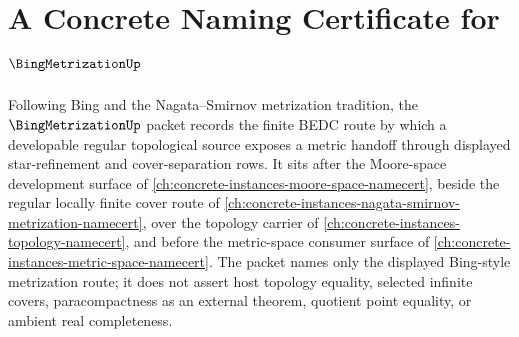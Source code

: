 \chapter{A Concrete Naming Certificate for $\BingMetrizationUp$}
\label{ch:concrete-instances-bing-metrization-namecert}

Following Bing and the Nagata--Smirnov metrization tradition, the $\BingMetrizationUp$ packet records the finite BEDC route by which a developable regular topological source exposes a metric handoff through displayed star-refinement and cover-separation rows. It sits after the Moore-space development surface of \autoref{ch:concrete-instances-moore-space-namecert}, beside the regular locally finite cover route of \autoref{ch:concrete-instances-nagata-smirnov-metrization-namecert}, over the topology carrier of \autoref{ch:concrete-instances-topology-namecert}, and before the metric-space consumer surface of \autoref{ch:concrete-instances-metric-space-namecert}. The packet names only the displayed Bing-style metrization route; it does not assert host topology equality, selected infinite covers, paracompactness as an external theorem, quotient point equality, or ambient real completeness.

